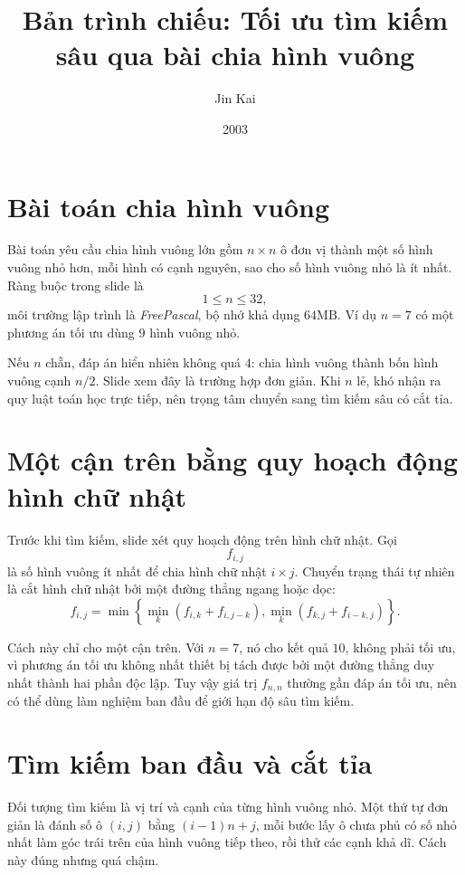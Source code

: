 \documentclass[11pt]{article}
\title{Bản trình chiếu: Tối ưu tìm kiếm sâu qua bài chia hình vuông}
\author{Jin Kai}
\date{2003}
\begin{document}
\maketitle


\section{Bài toán chia hình vuông}

Bài toán yêu cầu chia hình vuông lớn gồm \(n\times n\) ô đơn vị thành một số
hình vuông nhỏ hơn, mỗi hình có cạnh nguyên, sao cho số hình vuông nhỏ là ít
nhất. Ràng buộc trong slide là
\[
  1\le n\le 32,
\]
môi trường lập trình là \textit{FreePascal}, bộ nhớ khả dụng
\(64\mathrm{MB}\). Ví dụ \(n=7\) có một phương án tối ưu dùng \(9\) hình
vuông nhỏ.

Nếu \(n\) chẵn, đáp án hiển nhiên không quá \(4\): chia hình vuông thành bốn
hình vuông cạnh \(n/2\). Slide xem đây là trường hợp đơn giản. Khi \(n\) lẻ,
khó nhận ra quy luật toán học trực tiếp, nên trọng tâm chuyển sang tìm kiếm
sâu có cắt tỉa.

\section{Một cận trên bằng quy hoạch động hình chữ nhật}

Trước khi tìm kiếm, slide xét quy hoạch động trên hình chữ nhật. Gọi
\[
  f_{i,j}
\]
là số hình vuông ít nhất để chia hình chữ nhật \(i\times j\). Chuyển trạng
thái tự nhiên là cắt hình chữ nhật bởi một đường thẳng ngang hoặc dọc:
\[
  f_{i,j}=\min\left\{
    \min_k(f_{i,k}+f_{i,j-k}),
    \min_k(f_{k,j}+f_{i-k,j})
  \right\}.
\]

Cách này chỉ cho một cận trên. Với \(n=7\), nó cho kết quả \(10\), không phải
tối ưu, vì phương án tối ưu không nhất thiết bị tách được bởi một đường thẳng
duy nhất thành hai phần độc lập. Tuy vậy giá trị \(f_{n,n}\) thường gần đáp
án tối ưu, nên có thể dùng làm nghiệm ban đầu để giới hạn độ sâu tìm kiếm.

\section{Tìm kiếm ban đầu và cắt tỉa}

Đối tượng tìm kiếm là vị trí và cạnh của từng hình vuông nhỏ. Một thứ tự đơn
giản là đánh số ô \((i,j)\) bằng \((i-1)n+j\), mỗi bước lấy ô chưa phủ có số
nhỏ nhất làm góc trái trên của hình vuông tiếp theo, rồi thử các cạnh khả dĩ.
Cách này đúng nhưng quá chậm.
\end{document}

